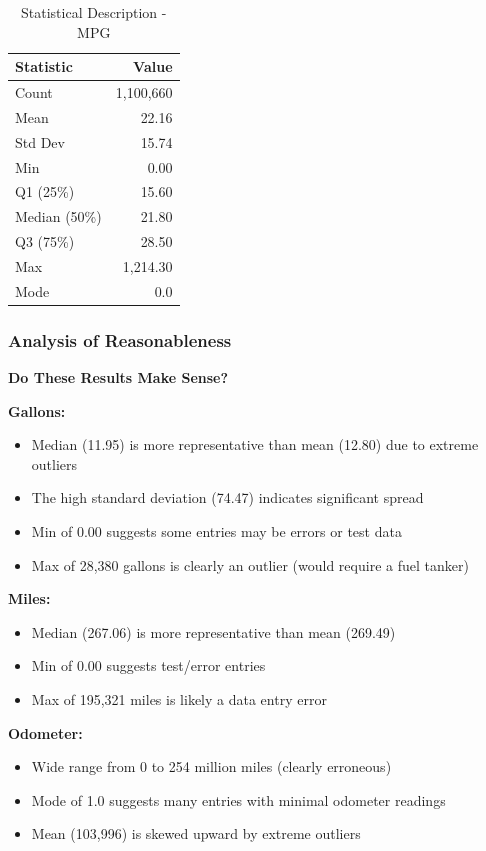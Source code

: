 \documentclass{article}
\begin{document}
\begin{table}[H]
    \centering
    \caption{Statistical Description - MPG}
    \begin{tabular}{l r}
        \toprule
        \textbf{Statistic} & \textbf{Value} \\
        \midrule
        Count & 1,100,660 \\
        Mean & 22.16 \\
        Std Dev & 15.74 \\
        Min & 0.00 \\
        Q1 (25\%) & 15.60 \\
        Median (50\%) & 21.80 \\
        Q3 (75\%) & 28.50 \\
        Max & 1,214.30 \\
        Mode & 0.0 \\
        \bottomrule
    \end{tabular}
    \label{tab:stats_mpg}
\end{table}

\subsubsection{Analysis of Reasonableness}

\textbf{Do These Results Make Sense?}

\textbf{Gallons:}
\begin{itemize}
    \item Median (11.95) is more representative than mean (12.80) due to extreme outliers
    \item The high standard deviation (74.47) indicates significant spread
    \item Min of 0.00 suggests some entries may be errors or test data
    \item Max of 28,380 gallons is clearly an outlier (would require a fuel tanker)
\end{itemize}

\textbf{Miles:}
\begin{itemize}
    \item Median (267.06) is more representative than mean (269.49) 
    \item Min of 0.00 suggests test/error entries
    \item Max of 195,321 miles is likely a data entry error
\end{itemize}

\textbf{Odometer:}
\begin{itemize}
    \item Wide range from 0 to 254 million miles (clearly erroneous)
    \item Mode of 1.0 suggests many entries with minimal odometer readings
    \item Mean (103,996) is skewed upward by extreme outliers
\end{itemize}
\end{document}
